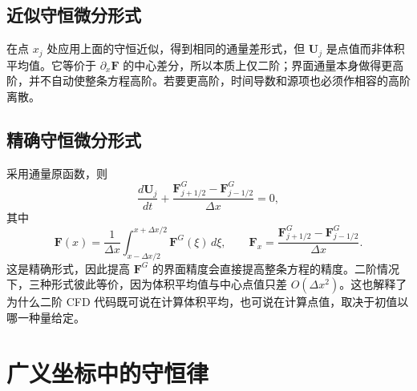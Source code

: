\documentclass[11pt,a4paper,openany,fontset=none]{ctexbook}
\begin{document}
\subsection*{近似守恒微分形式}
在点 $x_j$ 处应用上面的守恒近似，得到相同的通量差形式，但 $\bm U_j$ 是点值而非体积平均值。它等价于 $\partial_x\bm F$ 的中心差分，所以本质上仅二阶；界面通量本身做得更高阶，并不自动使整条方程高阶。若要更高阶，时间导数和源项也必须作相容的高阶离散。

\subsection*{精确守恒微分形式}
采用通量原函数，则
\begin{equation}
 \frac{d\bm U_j}{dt}+\frac{\bm F^G_{j+1/2}-\bm F^G_{j-1/2}}{\Delta x}=0, \tag{1.14.17}
\end{equation}
其中
\begin{equation}
 \bm F(x)=\frac1{\Delta x}\int_{x-\Delta x/2}^{x+\Delta x/2}\bm F^G(\xi)\,d\xi,\qquad
 \bm F_x=\frac{\bm F^G_{j+1/2}-\bm F^G_{j-1/2}}{\Delta x}. \tag{1.14.18}
\end{equation}
这是精确形式，因此提高 $\bm F^G$ 的界面精度会直接提高整条方程的精度。二阶情况下，三种形式彼此等价，因为体积平均值与中心点值只差 $O(\Delta x^2)$。这也解释了为什么二阶 CFD 代码既可说在计算体积平均，也可说在计算点值，取决于初值以哪一种量给定。

\section{广义坐标中的守恒律}
\end{document}
